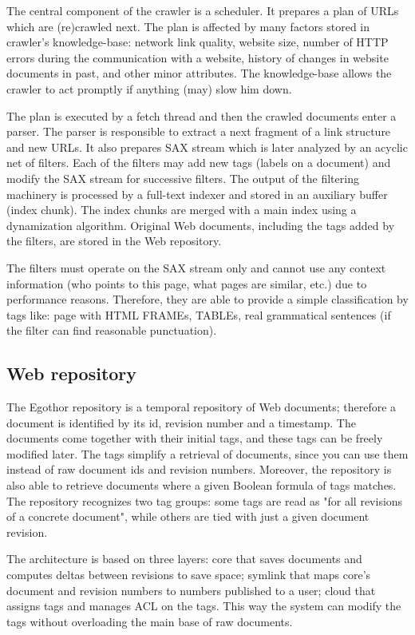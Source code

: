 \documentclass{sig-alternate}
\begin{document}
The central component of the crawler is a scheduler. It prepares a plan of URLs which are (re)crawled next.  The plan is affected by many factors stored in crawler's knowledge-base: network link quality, website size, number of HTTP errors during the communication with a website, history of changes in website documents in past, and other minor attributes. The knowledge-base allows the crawler to act promptly if anything (may) slow him down.

The plan is executed by a fetch thread and then the crawled documents enter a parser. The parser is responsible to extract a next fragment of a link structure and new URLs. It also prepares SAX stream which is later analyzed by an acyclic net of filters. Each of the filters may add new tags (labels on a document) and modify the SAX stream for successive filters. The output of the filtering machinery is processed by a full-text indexer and stored in an auxiliary buffer (index chunk).  The index chunks are merged with a main index using a dynamization algorithm. Original Web documents, including the tags added by the filters, are stored in the Web repository.

The filters must operate on the SAX stream only and cannot use any context information (who points to this page, what pages are similar, etc.) due to performance reasons. Therefore, they are able to provide a simple classification by tags like: page with HTML FRAMEs, TABLEs, real grammatical sentences (if the filter can find reasonable punctuation).


\subsection{Web repository}
The Egothor repository is a temporal repository of Web documents; therefore a document is identified by its id, revision number and a timestamp. The documents come together with their initial tags, and these tags can be freely modified later. The tags simplify a retrieval of documents, since you can use them instead of raw document ids and revision numbers. Moreover, the repository is also able to retrieve documents where a given Boolean formula of tags matches. The repository recognizes two tag groups: some tags are read as "for all revisions of a concrete document", while others are tied with just a given document revision.

The architecture is based on three layers: core that saves documents and computes deltas between revisions to save space; symlink that maps core's document and revision numbers to numbers published to a user; cloud that assigns tags and manages ACL on the tags. This way the system can modify the tags without overloading the main base of raw documents.
\end{document}

